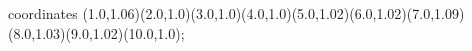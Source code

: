 					coordinates { (1.0,1.06)(2.0,1.0)(3.0,1.0)(4.0,1.0)(5.0,1.02)(6.0,1.02)(7.0,1.09)(8.0,1.03)(9.0,1.02)(10.0,1.0)};